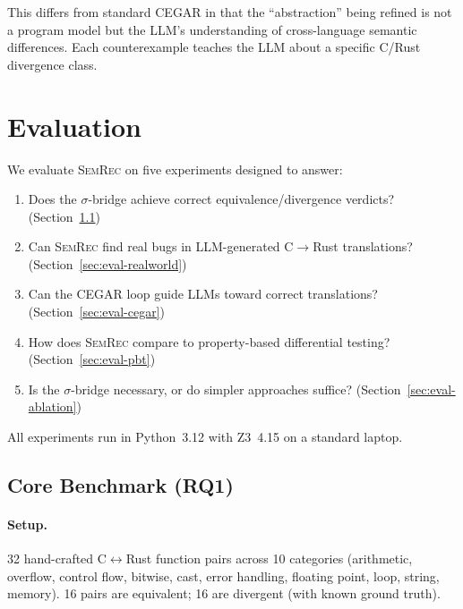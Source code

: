\documentclass[11pt,a4paper]{article}
\begin{document}
This differs from standard CEGAR in that the ``abstraction''
being refined is not a program model but the LLM's understanding of
cross-language semantic differences.  Each counterexample teaches the
LLM about a specific C/Rust divergence class.


\section{Evaluation}\label{sec:eval}

We evaluate \textsc{SemRec} on five experiments designed to answer:
\begin{enumerate}
  \item[\textbf{RQ1}] Does the $\sigma$-bridge achieve correct
    equivalence/divergence verdicts? (Section~\ref{sec:eval-core})
  \item[\textbf{RQ2}] Can \textsc{SemRec} find real bugs in LLM-generated
    C$\to$Rust translations? (Section~\ref{sec:eval-realworld})
  \item[\textbf{RQ3}] Can the CEGAR loop guide LLMs toward correct
    translations? (Section~\ref{sec:eval-cegar})
  \item[\textbf{RQ4}] How does \textsc{SemRec} compare to property-based
    differential testing? (Section~\ref{sec:eval-pbt})
  \item[\textbf{RQ5}] Is the $\sigma$-bridge necessary, or do simpler
    approaches suffice? (Section~\ref{sec:eval-ablation})
\end{enumerate}

All experiments run in Python~3.12 with Z3~4.15 on a standard laptop.

\subsection{Core Benchmark (RQ1)}\label{sec:eval-core}

\paragraph{Setup.} 32 hand-crafted C$\leftrightarrow$Rust function pairs
across 10 categories (arithmetic, overflow, control flow, bitwise, cast,
error handling, floating point, loop, string, memory).  16 pairs are
equivalent; 16 are divergent (with known ground truth).
\end{document}
